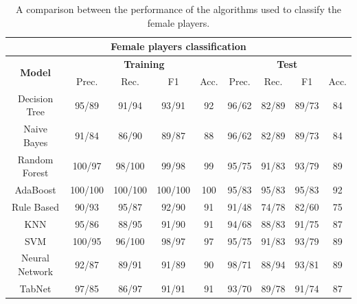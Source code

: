 \begin{table}[H]
\footnotesize
\centering
\begin{tabular}{c|c|c|c|c|c|c|c|c}\hline \hline
\multicolumn{9}{c}{\textbf{Female players classification}}\\ \hline \hline
\multirow{2}{*}{\textbf{Model}} & \multicolumn{4}{c|}{\textbf{Training}} & \multicolumn{4}{c}{\textbf{Test}} \\\cline{2-9}
& Prec. & Rec. & F1 & Acc. & Prec. & Rec. & F1 & Acc. \\\hline
Decision Tree & 95/89 & 91/94 & 93/91 & 92 & 96/62 & 82/89 & 89/73 & 84 \\
Naive Bayes & 91/84 & 86/90 & 89/87 & 88 & 96/62 & 82/89 & 89/73 & 84\\
\rowcolor{brown!50} Random Forest & 100/97 & 98/100 & 99/98 & 99 & 95/75 & 91/83 & 93/79 & 89\\
\rowcolor{yellow!70} AdaBoost & 100/100& 100/100 & 100/100 & 100 & 95/83 & 95/83 & 95/83 & 92\\
Rule Based & 90/93 & 95/87 & 92/90 & 91 & 91/48 & 74/78 & 82/60 & 75\\
KNN & 95/86 & 88/95 & 91/90 & 91 & 94/68 & 88/83 & 91/75 & 87\\
\rowcolor{brown!50} SVM & 100/95 & 96/100 & 98/97 & 97& 95/75 & 91/83 & 93/79 & 89\\
\rowcolor{gray!40} Neural Network & 92/87 & 89/91 & 91/89 & 90 & 98/71 & 88/94 & 93/81 & 89\\
TabNet & 97/85 & 86/97 & 91/91 & 91 & 93/70 & 89/78 & 91/74 & 87\\\hline \hline
\end{tabular}
\caption{A comparison between the performance of the algorithms used to classify the female players.}
\label{tab:female_compare}
\end{table}

